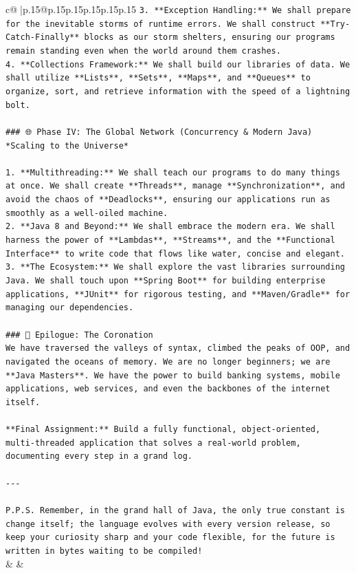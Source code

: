 \documentclass{article}
\begin{document}
{\begin{supertabular}{c@{$\;$}|p{.15\linewidth}@{}p{.15\linewidth}p{.15\linewidth}p{.15\linewidth}p{.15\linewidth}p{.15\linewidth}}
{{{\texttt{3.  **Exception Handling:** We shall prepare for the inevitable storms of runtime errors. We shall construct **Try{-}Catch{-}Finally** blocks as our storm shelters, ensuring our programs remain standing even when the world around them crashes.} \\
\texttt{4.  **Collections Framework:** We shall build our libraries of data. We shall utilize **Lists**, **Sets**, **Maps**, and **Queues** to organize, sort, and retrieve information with the speed of a lightning bolt.} \\
\\ 
\texttt{\#\#\# 🌐 Phase IV: The Global Network (Concurrency \& Modern Java)} \\
\texttt{*Scaling to the Universe*} \\
\\ 
\texttt{1.  **Multithreading:** We shall teach our programs to do many things at once. We shall create **Threads**, manage **Synchronization**, and avoid the chaos of **Deadlocks**, ensuring our applications run as smoothly as a well{-}oiled machine.} \\
\texttt{2.  **Java 8 and Beyond:** We shall embrace the modern era. We shall harness the power of **Lambdas**, **Streams**, and the **Functional Interface** to write code that flows like water, concise and elegant.} \\
\texttt{3.  **The Ecosystem:** We shall explore the vast libraries surrounding Java. We shall touch upon **Spring Boot** for building enterprise applications, **JUnit** for rigorous testing, and **Maven/Gradle** for managing our dependencies.} \\
\\ 
\texttt{\#\#\# 🎉 Epilogue: The Coronation} \\
\texttt{We have traversed the valleys of syntax, climbed the peaks of OOP, and navigated the oceans of memory. We are no longer beginners; we are **Java Masters**. We have the power to build banking systems, mobile applications, web services, and even the backbones of the internet itself.} \\
\\ 
\texttt{**Final Assignment:** Build a fully functional, object{-}oriented, multi{-}threaded application that solves a real{-}world problem, documenting every step in a grand log.} \\
\\ 
\texttt{{-}{-}{-}} \\
\\ 
\texttt{P.P.S. Remember, in the grand hall of Java, the only true constant is change itself; the language evolves with every version release, so keep your curiosity sharp and your code flexible, for the future is written in bytes waiting to be compiled!} \\
            }
        }
    }
    & & \\ \\


\end{supertabular}}
\end{document}
